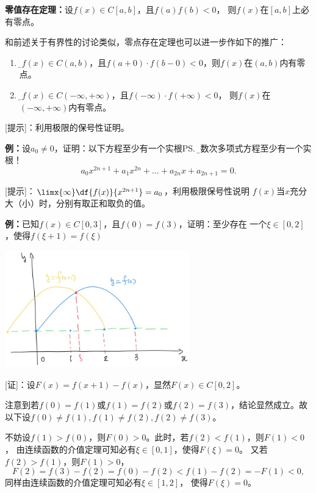 \begin{thx}
	{\bf 零值存在定理：}设$f(x)\in C[a,b]$，且$f(a)f(b)<0$，
	则$f(x)$在$[a,b]$上必有零点。
\end{thx}

和前述关于有界性的讨论类似，零点存在定理也可以进一步作如下的推广：
\begin{enumerate}[(1)]
  \setlength{\itemindent}{1cm}
  \item {\b 设$f(x)\in C(a,b)$，且$f(a+0)\cdot f(b-0)<0$，则$f(x)$在$(a,b)$内有零点。} 
  \item {\b 设$f(x)\in C(-\infty,+\infty)$，且$f(-\infty)\cdot f(+\infty)<0$，
  则$f(x)$在$(-\infty,+\infty)$内有零点。}
\end{enumerate}

[提示]：利用极限的保号性证明。

{\bf 例：}设$a_0\ne 0$，证明：以下方程至少有一个实根\ps{\b 奇数次多项式方程至少有一个实根！}
$$a_0x^{2n+1}+a_1x^{2n}+\ldots+a_{2n}x+a_{2n+1}=0.$$

[提示]：$\limx{\infty}\df{f(x)}{x^{2n+1}}=a_0$，利用极限保号性说明
$f(x)$当$x$充分大（小）时，分别有取正和取负的值。

{\bf 例：}已知$f(x)\in C[0,3]$，且$f(0)=f(3)$，证明：至少存在
一个$\xi\in[0,2]$，使得$f(\xi+1)=f(\xi)$

\begin{center}
	\includegraphics[width=8cm]{./images/ch1/f123.jpg}
\end{center}

[证]：设$F(x)=f(x+1)-f(x)$，显然$F(x)\in C[0,2]$。

注意到若$f(0)=f(1)$或$f(1)=f(2)$或$f(2)=f(3)$，结论显然成立。故以下设$f(0)\ne f(1),
f(1)\ne f(2),f(2)\ne f(3)$。

不妨设$f(1)>f(0)$，则$F(0)>0$。此时，若$f(2)<f(1)$，则$F(1)<0$，
由连续函数的介值定理可知必有$\xi\in[0,1]$，使得$F(\xi)=0$。
又若$f(2)>f(1)$，则$F(1)>0$，
$$F(2)=f(3)-f(2)=f(0)-f(2)<f(1)-f(2)=-F(1)<0,$$
同样由连续函数的介值定理可知必有$\xi\in[1,2]$，
使得$F(\xi)=0$。

